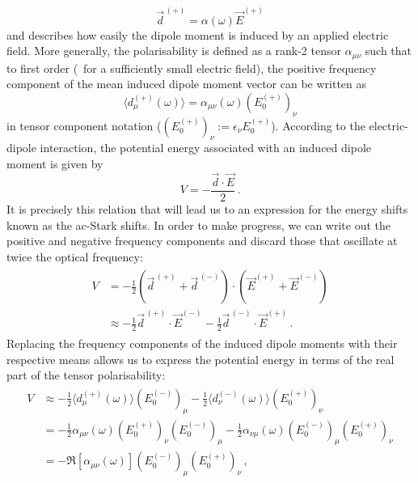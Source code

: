 \documentclass[../Thesis-IJspeert.tex]{subfiles}
\begin{document}
\begin{equation}
	\vec{d}^{\,(+)}=\alpha(\omega)\vec{E}^{(+)}
\end{equation}
and describes how easily the dipole moment is induced by an applied electric field. More generally, the polarisability is defined as a rank-2 tensor $\alpha_{\mu \nu}$ such that to first order (\ie\ for a sufficiently small electric field), the positive frequency component of the mean induced dipole moment vector can be written as
\begin{equation}
\label{definingrelationpolarisability}
\langle d_\mu^{(+)}(\omega) \rangle = \alpha_{\mu \nu}(\omega) ( E_0^{(+)} )_\nu	
\end{equation}
in tensor component notation ($( E_0^{(+)} )_\nu:={\epsilon}_\nu E_0^{(+)}$). According to the electric-dipole interaction, the potential energy associated with an induced dipole moment is given by
\begin{equation}
V = -\frac{\vec{d}\cdot \vec{E}}{2}\,.
\end{equation}
It is precisely this relation that will lead us to an expression for the energy shifts known as the ac-Stark shifts. In order to make progress, we can write out the positive and negative frequency components and discard those that oscillate at twice the optical frequency:
\begin{align}
\begin{split}
V &= -\frac{1}{2}\left( \vec{d}^{\,(+)} + \vec{d}^{\,(-)} \right) \cdot \left( \vec{E}^{(+)} + \vec{E}^{(-)} \right)\\ &\approx -\frac{1}{2} \vec{d}^{\,(+)}\cdot \vec{E}^{(-)} -\frac{1}{2} \vec{d}^{\,(-)} \cdot \vec{E}^{(+)}\,.
\end{split}
\end{align}
Replacing the frequency components of the induced dipole moments with their respective means allows us to express the potential energy in terms of the real part of the tensor polarisability:
\begin{align}
\begin{split}
V &\approx -\frac{1}{2} \langle d_\mu^{(+)}(\omega) \rangle ( E_0^{(-)} )_\mu  -\frac{1}{2} \langle d_\nu^{(-)}(\omega) \rangle ( E_0^{(+)} )_\nu \\&= -\frac{1}{2} \alpha_{\mu \nu}(\omega) ( E_0^{(+)} )_\nu ( E_0^{(-)} )_\mu -\frac{1}{2} \alpha_{\nu \mu}(\omega) ( E_0^{(-)} )_\mu ( E_0^{(+)} )_\nu \\ &= -\Re [ \alpha_{\mu \nu}(\omega) ] ( E_0^{(-)} )_\mu ( E_0^{(+)} )_\nu\,,
\end{split}
\end{align}
\end{document}

